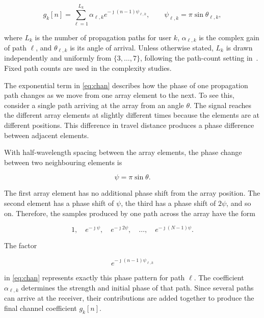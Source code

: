 \documentclass[journal]{IEEEtran}
\begin{document}
\begin{equation}
g_k[n]
=
\sum_{\ell=1}^{L_k}
\alpha_{\ell,k}
e^{-\jmath(n-1)\psi_{\ell,k}},
\qquad
\psi_{\ell,k}
=
\pi\sin\theta_{\ell,k},
\label{eq:chan}
\end{equation}

where $L_k$ is the number of propagation paths for user $k$,
$\alpha_{\ell,k}$ is the complex gain of path $\ell$, and
$\theta_{\ell,k}$ is its angle of arrival. Unless otherwise stated, $L_k$ is drawn independently and uniformly
from $\{3,\ldots,7\}$, following the path-count setting
in~\cite{xu2025}. Fixed path counts are used in the complexity studies.

The exponential term in \eqref{eq:chan} describes how the phase of one
propagation path changes as we move from one array element to the next.
To see this, consider a single path arriving at the array from an angle
$\theta$. The signal reaches the different array elements at slightly
different times because the elements are at different positions. This
difference in travel distance produces a phase difference between adjacent
elements.

With half-wavelength spacing between the array elements, the phase change
between two neighbouring elements is

\begin{equation}
\psi
=
\pi\sin\theta.
\end{equation}

The first array element has no additional phase shift from the array
position. The second element has a phase shift of $\psi$, the third has a
phase shift of $2\psi$, and so on. Therefore, the samples produced by one
path across the array have the form

\begin{equation}
1,\quad
e^{-\jmath\psi},\quad
e^{-\jmath2\psi},\quad
\ldots,\quad
e^{-\jmath(N-1)\psi}.
\end{equation}

The factor

\begin{equation}
e^{-\jmath(n-1)\psi_{\ell,k}}
\end{equation}

in \eqref{eq:chan} represents exactly this phase pattern for path $\ell$.
The coefficient $\alpha_{\ell,k}$ determines the strength and initial
phase of that path. Since several paths can arrive at the receiver, their
contributions are added together to produce the final channel coefficient
$g_k[n]$.
\end{document}

